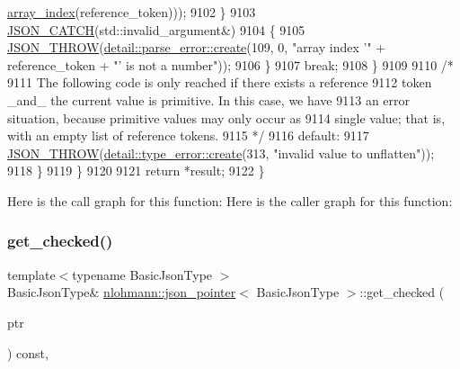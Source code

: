 \begin{DoxyCode}
      \hyperlink{classnlohmann_1_1json__pointer_ac53f5b79dd91da78743c437832f57ce4}{array\_index}(reference\_token)));
9102                     \}
9103                     \hyperlink{json_8hpp_a6954bec49ed2a2dfb938c1131c82740a}{JSON\_CATCH}(std::invalid\_argument&)
9104                     \{
9105                         \hyperlink{json_8hpp_a6c274f6db2e65c1b66c7d41b06ad690f}{JSON\_THROW}(\hyperlink{classnlohmann_1_1detail_1_1parse__error_a9fd60ad6bce80fd99686ad332faefd37}{detail::parse\_error::create}(109, 0,
       \textcolor{stringliteral}{"array index '"} + reference\_token + \textcolor{stringliteral}{"' is not a number"}));
9106                     \}
9107                     \textcolor{keywordflow}{break};
9108                 \}
9109 
9110                 \textcolor{comment}{/*}
9111 \textcolor{comment}{                The following code is only reached if there exists a reference}
9112 \textcolor{comment}{                token \_and\_ the current value is primitive. In this case, we have}
9113 \textcolor{comment}{                an error situation, because primitive values may only occur as}
9114 \textcolor{comment}{                single value; that is, with an empty list of reference tokens.}
9115 \textcolor{comment}{                */}
9116                 \textcolor{keywordflow}{default}:
9117                     \hyperlink{json_8hpp_a6c274f6db2e65c1b66c7d41b06ad690f}{JSON\_THROW}(\hyperlink{classnlohmann_1_1detail_1_1type__error_aecc083aea4b698c33d042670ba50c10f}{detail::type\_error::create}(313, \textcolor{stringliteral}{"invalid
       value to unflatten"}));
9118             \}
9119         \}
9120 
9121         \textcolor{keywordflow}{return} *result;
9122     \}
\end{DoxyCode}
Here is the call graph for this function\+:
Here is the caller graph for this function\+:
\mbox{\label{classnlohmann_1_1json__pointer_a366d68a67e40d86676d3bdb52e167294}} 
\subsubsection{\texorpdfstring{get\+\_\+checked()}{get\_checked()}\hspace{0.1cm}{\footnotesize\ttfamily [1/2]}}
{\footnotesize\ttfamily template$<$typename Basic\+Json\+Type $>$ \\
Basic\+Json\+Type\& \hyperlink{classnlohmann_1_1json__pointer}{nlohmann\+::json\+\_\+pointer}$<$ Basic\+Json\+Type $>$\+::get\+\_\+checked (\begin{DoxyParamCaption}\item[{Basic\+Json\+Type $\ast$}]{ptr }\end{DoxyParamCaption}) const\hspace{0.3cm}{\ttfamily [inline]}, {\ttfamily [private]}}


